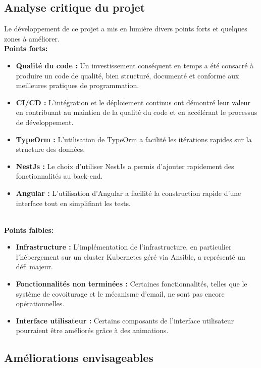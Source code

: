 \subsection{Analyse critique du projet}\label{subsec:analyse-critique}

Le développement de ce projet a mis en lumière divers points forts et quelques zones à améliorer.\\

\textbf{Points forts:}
\begin{itemize}
    \item \textbf{Qualité du code :} Un investissement conséquent en temps a été consacré à produire un code de qualité, bien structuré, documenté et conforme aux meilleures pratiques de programmation.
    \item \textbf{CI/CD :} L'intégration et le déploiement continus ont démontré leur valeur en contribuant au maintien de la qualité du code et en accélérant le processus de développement.
    \item \textbf{TypeOrm :} L'utilisation de TypeOrm a facilité les itérations rapides sur la structure des données.
    \item \textbf{NestJs :} Le choix d'utiliser NestJs a permis d'ajouter rapidement des fonctionnalités au back-end.
    \item \textbf{Angular :} L'utilisation d'Angular a facilité la construction rapide d'une interface tout en simplifiant les tests.
\end{itemize}\\

\textbf{Points faibles:}
\begin{itemize}
    \item \textbf{Infrastructure :} L'implémentation de l'infrastructure, en particulier l'hébergement sur un cluster Kubernetes géré via Ansible, a représenté un défi majeur.
    \item \textbf{Fonctionnalités non terminées :} Certaines fonctionnalités, telles que le système de covoiturage et le mécanisme d'email, ne sont pas encore opérationnelles.
    \item \textbf{Interface utilisateur :} Certains composants de l'interface utilisateur pourraient être améliorés grâce à des animations.
\end{itemize}

\subsection{Améliorations envisageables}\label{subsec:ameliorations}

